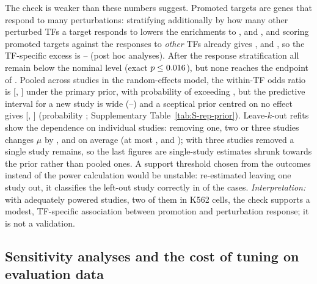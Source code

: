 The check is weaker than these numbers suggest.
Promoted targets are genes that respond to many perturbations: stratifying additionally by how many other perturbed TFs a target responds to lowers the enrichments to \nRepRespNorman{}, \nRepRespPapalexi{} and \nRepRespReplogle{}, and scoring promoted targets against the responses to \emph{other} TFs already gives \nRepWrongNorman{}, \nRepWrongPapalexi{} and \nRepWrongReplogle{}, so the TF-specific excess is \nRepSpecMin{}--\nRepSpecMax{} (post hoc analyses).
After the response stratification all \nRepPassPowN{} remain below the nominal level (exact $p\le0.016{}$), but none reaches the endpoint of \nRepEndpoint{}.
Pooled across studies in the random-effects model, the within-TF odds ratio is \nRepMu{} [\nRepMuLo{}, \nRepMuHi{}] under the primary prior, with probability \nRepPmu{} of exceeding \nRepEndpoint{}, but the predictive interval for a new study is wide (\nRepNewLo{}--\nRepNewHi{}) and a sceptical prior centred on no effect gives \nRepSkept{} [\nRepSkeptLo{}, \nRepSkeptHi{}] (probability \nRepSkeptP{}; Supplementary Table~\ref{tab:S-rep-prior}).
Leave-$k$-out refits show the dependence on individual studies: removing one, two or three studies changes $\mu$ by \nRepLkMeanOne{}, \nRepLkMeanTwo{} and \nRepLkMeanThree{} on average (at most \nRepLkMaxOne{}, \nRepLkMaxTwo{} and \nRepLkMaxThree{}); with three studies removed a single study remains, so the last figures are single-study estimates shrunk towards the prior rather than pooled ones.
A support threshold chosen from the outcomes instead of the power calculation would be unstable: re-estimated leaving one study out, it classifies the left-out study correctly in \nRepTau{} of the cases.
\emph{Interpretation:} with \nRepPassPowD{} adequately powered studies, two of them in K562 cells, the check supports a modest, TF-specific association between promotion and perturbation response; it is not a validation.


\subsection{Sensitivity analyses and the cost of tuning on evaluation data}\label{sec:res-sensitivity}

